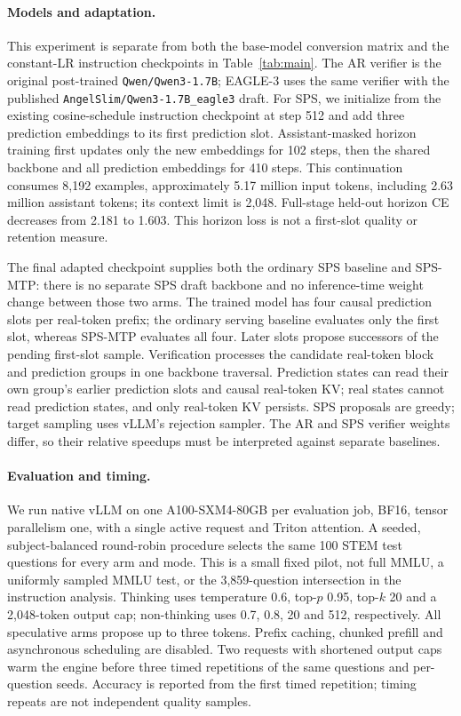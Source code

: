 \paragraph{Models and adaptation.}
This experiment is separate from both the base-model conversion matrix and the constant-LR instruction checkpoints in Table~\ref{tab:main}. The AR verifier is the original post-trained \texttt{Qwen/Qwen3-1.7B}; EAGLE-3 \citep{li2025eagle3} uses the same verifier with the published \texttt{AngelSlim/Qwen3-1.7B\_eagle3} draft. For SPS, we initialize from the existing cosine-schedule instruction checkpoint at step 512 and add three prediction embeddings to its first prediction slot. Assistant-masked horizon training first updates only the new embeddings for 102 steps, then the shared backbone and all prediction embeddings for 410 steps. This continuation consumes 8,192 examples, approximately 5.17 million input tokens, including 2.63 million assistant tokens; its context limit is 2,048. Full-stage held-out horizon CE decreases from 2.181 to 1.603. This horizon loss is not a first-slot quality or retention measure.

The final adapted checkpoint supplies both the ordinary SPS baseline and SPS-MTP: there is no separate SPS draft backbone and no inference-time weight change between those two arms. The trained model has four causal prediction slots per real-token prefix; the ordinary serving baseline evaluates only the first slot, whereas SPS-MTP evaluates all four. Later slots propose successors of the pending first-slot sample. Verification processes the candidate real-token block and prediction groups in one backbone traversal. Prediction states can read their own group's earlier prediction slots and causal real-token KV; real states cannot read prediction states, and only real-token KV persists. SPS proposals are greedy; target sampling uses vLLM's rejection sampler. The AR and SPS verifier weights differ, so their relative speedups must be interpreted against separate baselines.

\paragraph{Evaluation and timing.}
We run native vLLM \citep{kwon2023vllm} on one A100-SXM4-80GB per evaluation job, BF16, tensor parallelism one, with a single active request and Triton attention. A seeded, subject-balanced round-robin procedure selects the same 100 STEM test questions for every arm and mode. This is a small fixed pilot, not full MMLU, a uniformly sampled MMLU test, or the 3,859-question intersection in the instruction analysis. Thinking uses temperature 0.6, top-$p$ 0.95, top-$k$ 20 and a 2,048-token output cap; non-thinking uses 0.7, 0.8, 20 and 512, respectively. All speculative arms propose up to three tokens. Prefix caching, chunked prefill and asynchronous scheduling are disabled. Two requests with shortened output caps warm the engine before three timed repetitions of the same questions and per-question seeds. Accuracy is reported from the first timed repetition; timing repeats are not independent quality samples.

